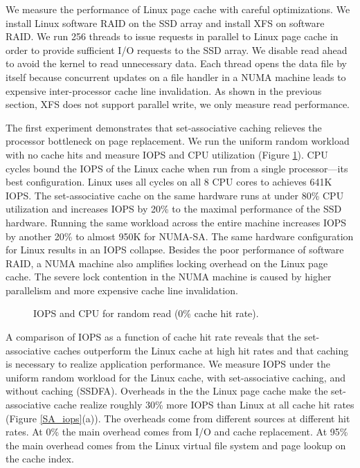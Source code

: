 We measure the performance of Linux page cache with careful optimizations.
We install Linux software RAID on the SSD array and install XFS on software
RAID. We run 256 threads to issue requests in parallel to
Linux page cache in order to provide sufficient I/O requests to the SSD array.
We disable read ahead to avoid the kernel to read unnecessary data.
Each thread opens the data file by itself because concurrent updates on a file handler
in a NUMA machine leads to expensive inter-processor cache line invalidation.
As shown in the previous section, XFS does not support parallel write, we only
measure read performance. 



The first experiment demonstrates that set-associative caching relieves the processor
bottleneck on page replacement.
We run the uniform random workload with no cache hits and measure
IOPS and CPU utilization (Figure \ref{compare_cache}).
CPU cycles bound the IOPS of the Linux cache when run from a single processor---its best 
configuration.  Linux uses all cycles on all 8 CPU cores to achieves 641K IOPS.  The set-associative 
cache on the same hardware runs at under 80\% CPU utilization and increases IOPS by 20\%
to the maximal performance of the SSD hardware.
Running the same workload across the entire machine increases IOPS by 
another 20\% to almost 950K for NUMA-SA.  The same hardware configuration
for Linux results in an IOPS collapse.
Besides the poor performance of software RAID, a NUMA machine also amplifies
locking overhead on the Linux page cache. The severe lock contention
in the NUMA machine is caused by higher parallelism and
more expensive cache line invalidation.

\begin{figure}[tb]
\begin{center}
\vspace{-15pt}

\vspace{-15pt}
\caption{IOPS and CPU for random read (0\% cache hit rate).}
\label{compare_cache}
\end{center}
\end{figure}

A comparison of IOPS as a function of cache hit rate
reveals that the set-associative caches outperform the Linux cache at high hit rates 
and that caching is necessary to realize application performance.
We measure IOPS under the uniform random workload for the Linux cache,
with set-associative caching, and without caching (SSDFA).
Overheads in the the Linux page cache make the set-associative cache 
realize roughly 30\% more IOPS than Linux at all cache hit rates (Figure \ref{SA_iops}(a)).  
The overheads come from different sources at different hit rates.  At 0\% the 
main overhead comes from I/O and cache replacement.  At 95\% the main overhead comes 
from the Linux virtual file system \cite{linux_vfs} and page lookup on the cache index.

